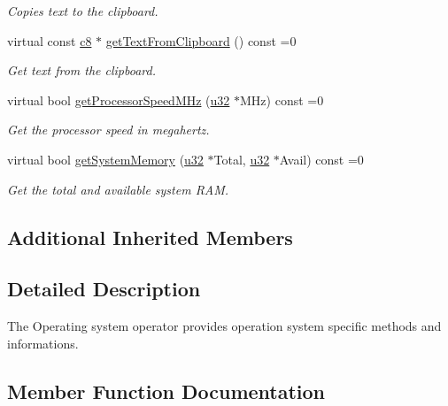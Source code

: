 \begin{DoxyCompactItemize}
\begin{DoxyCompactList}\small\item\em Copies text to the clipboard. \end{DoxyCompactList}\item 
virtual const \hyperlink{namespaceirr_a9395eaea339bcb546b319e9c96bf7410}{c8} $\ast$ \hyperlink{classirr_1_1IOSOperator_a058508332b292594046ec8b7d804f513}{get\+Text\+From\+Clipboard} () const  =0
\begin{DoxyCompactList}\small\item\em Get text from the clipboard. \end{DoxyCompactList}\item 
virtual bool \hyperlink{classirr_1_1IOSOperator_a8dd05488cbbcc4a6d8b12ecad2579129}{get\+Processor\+Speed\+M\+Hz} (\hyperlink{namespaceirr_a0416a53257075833e7002efd0a18e804}{u32} $\ast$M\+Hz) const  =0
\begin{DoxyCompactList}\small\item\em Get the processor speed in megahertz. \end{DoxyCompactList}\item 
virtual bool \hyperlink{classirr_1_1IOSOperator_abd6567708e997ed7731f3147c1dd5829}{get\+System\+Memory} (\hyperlink{namespaceirr_a0416a53257075833e7002efd0a18e804}{u32} $\ast$Total, \hyperlink{namespaceirr_a0416a53257075833e7002efd0a18e804}{u32} $\ast$Avail) const  =0
\begin{DoxyCompactList}\small\item\em Get the total and available system R\+AM. \end{DoxyCompactList}\end{DoxyCompactItemize}
\subsection*{Additional Inherited Members}


\subsection{Detailed Description}
The Operating system operator provides operation system specific methods and informations. 

\subsection{Member Function Documentation}
